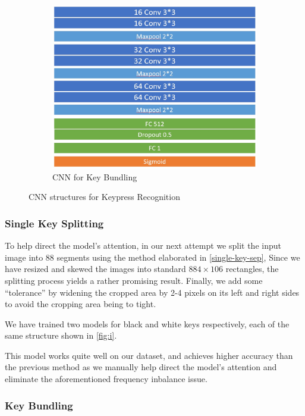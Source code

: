 \documentclass[10pt,twocolumn,letterpaper]{article}
\begin{document}
\begin{figure}[h!]
\begin{subfigure}{0.4\textwidth}
         \includegraphics[width=\linewidth]{fig/12.png}
         \caption{CNN for Key Bundling} \label{fig:j}
       \end{subfigure}
      \caption{CNN structures for Keypress Recognition} \label{fig:3}
   \end{figure}

\subsubsection{Single Key Splitting}

To help direct the model's attention, in our next attempt we split the input image into 88 segments using the method elaborated in \ref{single-key-sep}, 
Since we have resized and skewed the images into standard \(884 \times 106\) rectangles, the splitting process yields a rather promising result. 
Finally, we add some ``tolerance'' by widening the cropped area by 2-4 pixels on its left and right sides to avoid the cropping area being to tight. 

We have trained two models for black and white keys respectively, each of the same structure shown in \ref{fig:i}.

This model works quite well on our dataset, and achieves higher accuracy than the previous method as we manually help direct the model's attention and eliminate the aforementioned frequency inbalance issue.

\subsubsection{Key Bundling}
\end{document}
